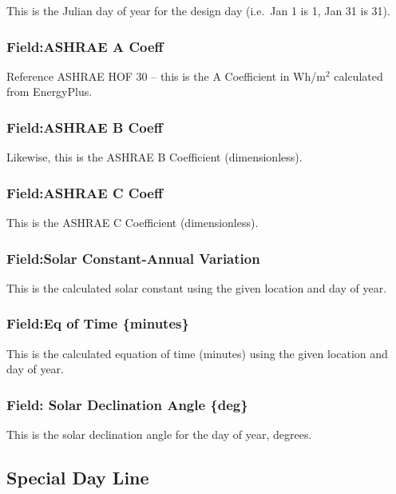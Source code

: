 This is the Julian day of year for the design day (i.e.~Jan 1 is 1, Jan 31 is 31).

\subsubsection{Field:ASHRAE A Coeff}\label{fieldashrae-a-coeff}

Reference ASHRAE HOF 30 -- this is the A Coefficient in Wh/m\(^{2}\) calculated from EnergyPlus.

\subsubsection{Field:ASHRAE B Coeff}\label{fieldashrae-b-coeff}

Likewise, this is the ASHRAE B Coefficient (dimensionless).

\subsubsection{Field:ASHRAE C Coeff}\label{fieldashrae-c-coeff}

This is the ASHRAE C Coefficient (dimensionless).

\subsubsection{Field:Solar Constant-Annual Variation}\label{fieldsolar-constant-annual-variation}

This is the calculated solar constant using the given location and day of year.

\subsubsection{Field:Eq of Time \{minutes\}}\label{fieldeq-of-time-minutes}

This is the calculated equation of time (minutes) using the given location and day of year.

\subsubsection{Field: Solar Declination Angle \{deg\}}\label{field-solar-declination-angle-deg}

This is the solar declination angle for the day of year, degrees.

\subsection{Special Day Line}\label{special-day-line}

